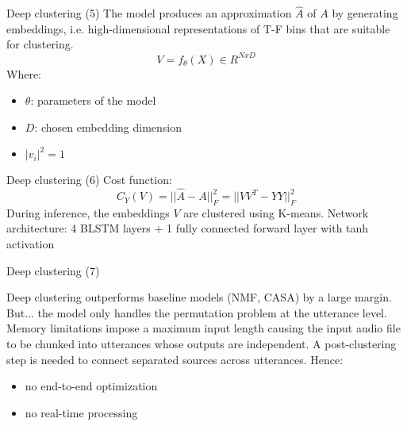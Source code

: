 \documentclass[11pt]{beamer}
\begin{document}
\begin{frame}{Deep clustering (5)}
The model produces an approximation $\hat{A}$ of $A$ by generating embeddings, i.e. high-dimensional representations of T-F bins that are suitable for clustering.
\linebreak
\linebreak
\begin{equation}
V = f_{\theta}(X) \in R^{NxD}
\end{equation}
\linebreak
Where: 
\begin{itemize}
\item $\theta$: parameters of the model
\item $D$: chosen embedding dimension
\item $|v_i|^2=1$
\end{itemize}

\end{frame}

\begin{frame}{Deep clustering (6)}
Cost function:
\linebreak
\begin{equation}
C_Y(V) = ||\hat{A} - A||^2_{F} = ||VV^T - YY||^2_{F}
\end{equation}
\linebreak
\linebreak
During inference, the embeddings $V$ are clustered using K-means.
\linebreak
\linebreak
Network architecture: 4 BLSTM layers + 1 fully connected forward layer with tanh activation
\end{frame}

\begin{frame}{Deep clustering (7)}

Deep clustering outperforms baseline models (NMF, CASA) by a large margin.
\linebreak
\linebreak
But... the model only handles the permutation problem at the utterance level. Memory limitations impose a maximum input length causing the input audio file to be chunked into utterances whose outputs are independent. A post-clustering step is needed to connect separated sources across utterances. Hence:
\begin{itemize}
\item no end-to-end optimization
\item no real-time processing
\end{itemize}

\end{frame}
\end{document}
